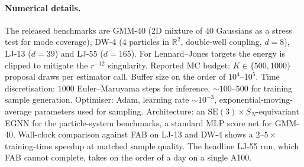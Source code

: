 \documentclass[11pt,letterpaper]{article}
\newcommand{\Real}{\mathbb{R}}
\theoremstyle{plain}
\begin{document}
\paragraph{Numerical details.} The released benchmarks are GMM-40 (2D mixture
of $40$ Gaussians as a stress test for mode coverage), DW-4 ($4$ particles in
$\Real^2$, double-well coupling, $d=8$), LJ-13 ($d=39$) and LJ-55 ($d=165$).
For Lennard--Jones targets the energy is clipped to mitigate the $r^{-12}$
singularity. Reported MC budget: $K\in\{500,1000\}$ proposal draws per
estimator call. Buffer size on the order of $10^4$--$10^5$. Time
discretisation: $1000$ Euler--Maruyama steps for inference, $\sim 100$--$500$
for training sample generation. Optimiser: Adam, learning rate $\sim 10^{-3}$,
exponential-moving-average parameters used for sampling. Architecture: an
$\mathrm{SE}(3)\times S_N$-equivariant EGNN for the particle-system
benchmarks, a standard MLP score net for GMM-40. Wall-clock comparison
against FAB on LJ-13 and DW-4 shows a $2$--$5\times$ training-time speedup at
matched sample quality. The headline LJ-55 run, which FAB cannot complete,
takes on the order of a day on a single A100.
\end{document}
